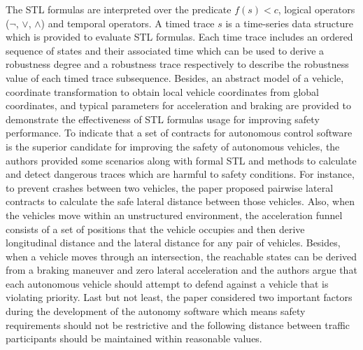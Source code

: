 \documentclass[10pt,a4paper]{report}
\begin{document}
The STL formulas are interpreted over the predicate $f(s) < c$, logical operators ($\neg$, $\lor$, $\land$) and temporal operators.
%
A timed trace $s$ is a time-series data structure which is provided to evaluate STL formulas.
%
Each time trace includes an ordered sequence of states and their associated time which can be used to derive a robustness degree and a robustness trace respectively to describe the robustness value of each timed trace subsequence.
%
Besides, an abstract model of a vehicle, coordinate transformation to obtain local vehicle coordinates from global coordinates, and typical parameters for acceleration and braking are provided to demonstrate the effectiveness of STL formulas usage for improving safety performance.
%
To indicate that a set of contracts for autonomous control software is the superior candidate for improving the safety of autonomous vehicles, the authors provided some scenarios along with formal STL and methods to calculate and detect dangerous traces which are harmful to safety conditions.
%
For instance, to prevent crashes between two vehicles, the paper proposed pairwise lateral contracts to calculate the safe lateral distance between those vehicles.
%
Also, when the vehicles move within an unstructured environment, the acceleration funnel consists of a set of positions that the vehicle occupies and then derive longitudinal distance and the lateral distance for any pair of vehicles.
%
Besides, when a vehicle moves through an intersection, the reachable states can be derived from a braking maneuver and zero lateral acceleration and the authors argue that each autonomous vehicle should attempt to defend against a vehicle that is violating priority.
%
Last but not least, the paper considered two important factors during the development of the autonomy software which means safety requirements should not be restrictive and the following distance between traffic participants should be maintained within reasonable values.
\end{document}
